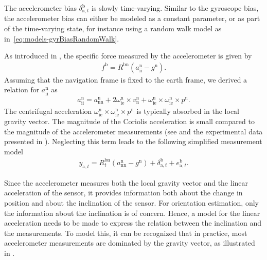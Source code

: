 The accelerometer bias $\delta_{\text{a},t}^\text{b}$ is slowly time-varying. Similar to the gyroscope bias, the accelerometer bias can either be modeled as a constant parameter, or as part of the time-varying state, for instance using a random walk model as in~\eqref{eq:models-gyrBiasRandomWalk}.

As introduced in , the specific force measured by the accelerometer is given by
\begin{align}
\label{eq:models-specForce}
f^\text{b} = R^{\text{bn}} 
( a_{\text{ii}}^\text{n} - g^\text{n} ).
\end{align}
Assuming that the navigation frame is fixed to the earth frame, we derived a relation for $a_\text{ii}^\text{n}$ as
\begin{align}
\label{eq:models-aii-ann} 
a_\text{ii}^\text{n} = 
a_\text{nn}^\text{n} + 
2 \omega_\text{ie}^\text{n} \times v^\text{n}_\text{n} + 
\omega_\text{ie}^\text{n} \times \omega_\text{ie}^\text{n}
\times p^\text{n}. 
\end{align}
The centrifugal acceleration $\omega_\text{ie}^\text{n} \times \omega_\text{ie}^\text{n}
\times p^\text{n}$ is typically absorbed in the local gravity vector. The magnitude of the Coriolis acceleration is small compared to the magnitude of the accelerometer measurements (see  and the experimental data presented in ). Neglecting this term leads to the following simplified measurement model
\begin{align}
\label{eq:models-accMeasModel}
y_{\text{a},t} 
= R^{\text{bn}}_t  ( a_{\text{nn}}^\text{n} - g^\text{n} )
+ \delta_{\text{a},t}^\text{b}
+ e_{\text{a},t}^\text{b}.
\end{align} 

Since the accelerometer measures both the local gravity vector and the linear acceleration of the sensor, it provides information both about the change in position and about the inclination of the sensor. For orientation estimation, only the information about the inclination is of concern. Hence, a model for the linear acceleration needs to be made to express the relation between the inclination and the measurements. To model this, it can be recognized that in practice, most accelerometer measurements are dominated by the gravity vector, as illustrated in . 

